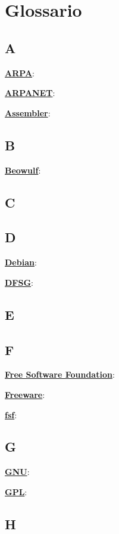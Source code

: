 \section{Glossario}

\subsection*{A}

\underline{\textbf{ARPA}}: %

\underline{\textbf{ARPANET}}: %

\underline{\textbf{Assembler}}: %

\subsection*{B}

\underline{\textbf{Beowulf}}: %

\subsection*{C}

\subsection*{D}

\underline{\textbf{Debian}}: %

\underline{\textbf{DFSG}}: %

\subsection*{E}

\subsection*{F}

\underline{\textbf{Free Software Foundation}}: %

\underline{\textbf{Freeware}}: %

\underline{\textbf{fsf}}: %

\subsection*{G}

\underline{\textbf{GNU}}: %

\underline{\textbf{GPL}}: %

\subsection*{H}

